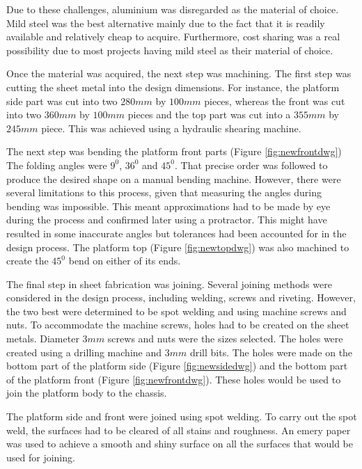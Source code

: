 Due to these challenges, aluminium was disregarded as the material of choice. Mild steel was the best alternative mainly due to the fact that it is readily available and relatively cheap to acquire. Furthermore, cost sharing was a real possibility due to most projects having mild steel as their material of choice.
\vspace{2mm}

Once the material was acquired, the next step was machining. The first step was cutting the sheet metal into the design dimensions. For instance, the platform side part was cut into two $280mm$ by $100mm$ pieces, whereas the front was cut into two $360mm$ by $100mm$ pieces and the top part was cut into a $355mm$ by $245mm$ piece. This was achieved using a hydraulic shearing machine.

\vspace{3mm}
The next step was bending the platform front parts (Figure \ref{fig:newfrontdwg})
The folding angles were $9^0$, $36^0$ and $45^0$. That precise order was followed to produce the desired shape on a manual bending machine. However, there were several limitations to this process, given that measuring the angles during bending was impossible. This meant approximations had to be made by eye during the process and confirmed later using a protractor. This might have resulted in some inaccurate angles but tolerances had been accounted for in the design process. The platform top (Figure \ref{fig:newtopdwg}) was also  machined to create the $45^0$ bend on either of its ends.


The final step in sheet fabrication was joining. Several joining methods were considered in the design process, including welding, screws and riveting. However, the two best were determined to be spot welding and using machine screws and nuts. To accommodate the machine screws, holes had to be created on the sheet metals. Diameter $3mm$ screws and nuts were the sizes selected. The holes were created using a drilling machine and $3mm$ drill bits. The holes were made on the bottom part of the platform side (Figure \ref{fig:newsidedwg}) and the bottom part of the platform front (Figure \ref{fig:newfrontdwg}). These holes would be used to join the platform body to the chassis.

\vspace{3mm}
The platform side and front were joined using spot welding. To carry out the spot weld, the surfaces had to be cleared of all stains and roughness. An emery paper was used to achieve a smooth and shiny surface on all the surfaces that would be used for joining. 


